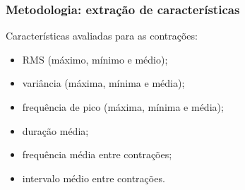 \documentclass{beamer}
\begin{document}


\begin{frame}
	\frametitle{Metodologia: extração de características}	
	
	Características avaliadas para as contrações: 
	
	\begin{itemize}
		
		\item RMS (máximo, mínimo e médio);
		
		\item variância (máxima, mínima e média);
		
		\item frequência de pico (máxima, mínima e média);
		
		\item duração média;
		
		\item frequência média entre contrações;
		
		\item intervalo médio entre contrações.
		
		
		
	\end{itemize}
	
\end{frame}













\end{document}

